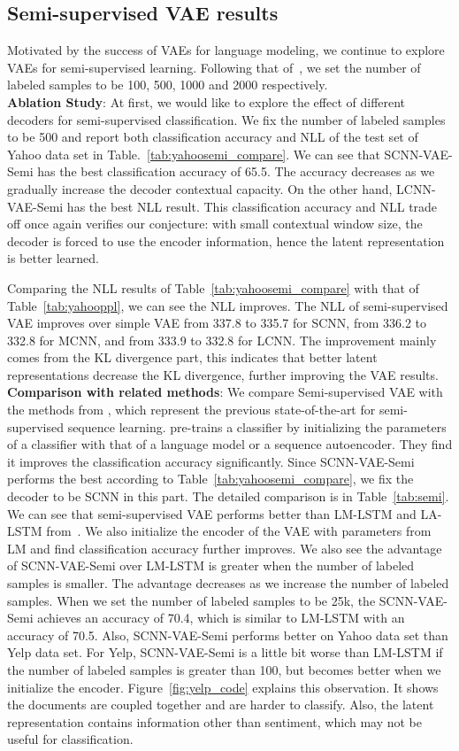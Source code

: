 \documentclass{article}
\begin{document}
\subsection{Semi-supervised VAE results}
Motivated by the success of VAEs for language modeling, we continue to explore
VAEs for semi-supervised learning. Following that of~\cite{kingma2014semi},
we set the number of labeled samples to be 100, 500, 1000 and 2000 respectively.
\\[0.2cm]
{\bf Ablation Study}: At first, we would like to explore the effect of
different decoders for semi-supervised classification.
We fix the number of labeled samples to be 500 and report
both classification accuracy and NLL of the test set of Yahoo data set in
Table.~\ref{tab:yahoosemi_compare}. We can see that SCNN-VAE-Semi has the best
classification accuracy of 65.5. The accuracy decreases as we gradually increase the
decoder contextual capacity. On the other hand, LCNN-VAE-Semi
has the best NLL result. This classification accuracy and NLL trade off
once again verifies our conjecture: with small contextual window size,
the decoder is forced to use the encoder information, hence the latent
representation is better learned.

Comparing the NLL results of Table~\ref{tab:yahoosemi_compare}
with that of Table~\ref{tab:yahooppl}, we can see the
NLL improves. The NLL of semi-supervised VAE improves over simple
VAE from 337.8 to 335.7 for SCNN, from 336.2 to 332.8 for MCNN,
and from 333.9 to 332.8 for LCNN.
The improvement mainly comes from the KL divergence part, this indicates that better latent
representations decrease the KL divergence, further improving
the VAE results.
\\[0.2cm]
{\bf Comparison with related methods}: We compare Semi-supervised VAE with the
methods from \cite{dai2015semi}, which represent the previous state-of-the-art for semi-supervised
sequence learning. \citet{dai2015semi} pre-trains a classifier by initializing the parameters
of a classifier with that of a language model or a sequence autoencoder. They find it improves
the classification accuracy significantly. Since SCNN-VAE-Semi performs the best
according to Table~\ref{tab:yahoosemi_compare}, we fix
the decoder to be SCNN in this part. The detailed comparison is in
Table~\ref{tab:semi}. We can see that semi-supervised VAE performs better than LM-LSTM and
LA-LSTM from~\cite{dai2015semi}. We also initialize the encoder of the VAE with parameters
from LM and find classification accuracy further improves.
We also see the advantage of SCNN-VAE-Semi
over LM-LSTM is greater when the number of labeled samples is smaller. The
advantage decreases as we increase the number of labeled samples. When we
set the number of labeled samples to be 25k, the SCNN-VAE-Semi achieves an accuracy of 70.4,
which is similar to LM-LSTM with an accuracy of 70.5. Also, SCNN-VAE-Semi performs better on Yahoo
data set than Yelp data set. For Yelp, SCNN-VAE-Semi is a little bit worse than LM-LSTM
if the number of labeled samples is greater than 100, but becomes better when we initialize the encoder.
Figure~\ref{fig:yelp_code} explains this observation. It shows the documents are coupled
together and are harder to classify. Also, the latent representation contains
information other than sentiment, which may not be useful for classification.
\end{document}
